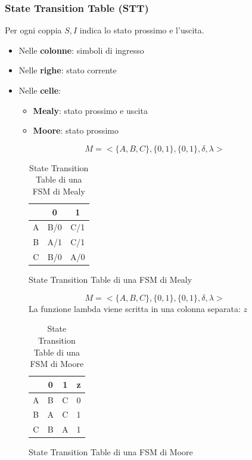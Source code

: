 \documentclass[a4paper]{article}
\theoremstyle{break}
\theoremstyle{break}
\theoremstyle{break}
\theoremstyle{break}
\begin{document}
\subsubsection{State Transition Table (STT)}
Per ogni coppia \( S,I \) indica lo stato prossimo e l'uscita.
\begin{itemize}
  \item Nelle \textbf{colonne}: simboli di ingresso
  \item Nelle \textbf{righe}: stato corrente
  \item Nelle \textbf{celle}: 
    \begin{itemize}
      \item \textbf{Mealy}: stato prossimo e uscita
      \item \textbf{Moore}: stato prossimo
    \end{itemize}
\end{itemize}

\begin{figure}[H]
  \begin{example}[Mealy]
    \[ M= <\{A,B,C\}, \{0,1\}, \{0,1\}, \delta, \lambda> \]
    \begin{table}[H]
      \begin{center}
        \begin{tabular}{c|c|c}
          & 0 & 1 \\
          \hline
          A & B/0 & C/1\\
          \hline
          B & A/1 & C/1\\
          \hline
          C & B/0 & A/0\\
        \end{tabular}
      \end{center}
      \caption{State Transition Table di una FSM di Mealy}
    \end{table}
  \end{example}
\end{figure}

\begin{figure}[H]
  \begin{example}[Moore]
    \[ M= <\{A,B,C\}, \{0,1\}, \{0,1\}, \delta, \lambda> \]
    La funzione lambda viene scritta in una colonna separata: \( z \) 
    \begin{table}[H]
      \begin{center}
        \begin{tabular}{c|c|c|c}
          & 0 & 1 & z\\
          \hline
          A & B & C & 0 \\
          \hline
          B & A & C & 1 \\
          \hline
          C & B & A & 1 \\
        \end{tabular}
      \end{center}
      \caption{State Transition Table di una FSM di Moore}
    \end{table}
  \end{example}
\end{figure}
\end{document}
